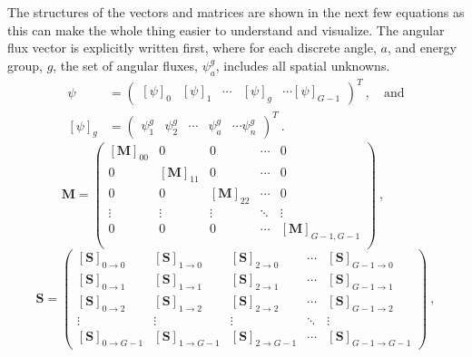 \documentclass[12pt]{article}
\newcommand{\ve}[1]{\ensuremath{\mathbf{#1}}}
\begin{document}
The structures of the vectors and matrices are shown in the next few equations as this can make the whole thing easier to understand and visualize. The angular flux vector is explicitly written first, where for each discrete angle, $a$, and energy group, $g$, the set of angular fluxes, $ \psi^g_a$, includes all spatial unknowns.
%
 \begin{align}
    \psi &=     \begin{pmatrix}
    [\psi]_{0} & [\psi]_1 & \cdots & [\psi]_g & \cdots [\psi]_{G-1} 
  \end{pmatrix}^T  \:, \quad \text{and}  \\
    [\psi]_g &= \begin{pmatrix}
    \psi^g_1 & \psi^g_2& \cdots & \psi^g_a & \cdots \psi^g_n 
  \end{pmatrix}^T \:.  
\end{align}
%
\begin{equation}
  \mathbf{M} =    \begin{pmatrix}
      [\ve{M}]_{00} & 0 & 0 & \cdots & 0 \\
      0 & [\ve{M}]_{11} & 0 & \cdots & 0 \\
      0 & 0 & [\ve{M}]_{22} & \cdots & 0 \\
      \vdots & \vdots & \vdots & \ddots   & \vdots \\
      0 & 0 & 0 & \cdots & [\ve{M}]_{G-1,G-1} \\
    \end{pmatrix} \nonumber  \:, \qquad  %
    \end{equation}
    \begin{equation}
  \mathbf{S}  =     \begin{pmatrix}
      [\ve{S}]_{0\rightarrow0} & [\ve{S}]_{1\rightarrow0} & [\ve{S}]_{2\rightarrow0} & \cdots &
      [\ve{S}]_{G-1\rightarrow0} \\
      [\ve{S}]_{0\rightarrow1} & [\ve{S}]_{1\rightarrow1} & [\ve{S}]_{2\rightarrow1} & \cdots &
      [\ve{S}]_{G-1\rightarrow1} \\
      [\ve{S}]_{0\rightarrow2} & [\ve{S}]_{1\rightarrow2} & [\ve{S}]_{2\rightarrow2} & \cdots &
      [\ve{S}]_{G-1\rightarrow2} \\
      \vdots & \vdots & \vdots & \ddots & \vdots \\
      [\ve{S}]_{0\rightarrow G-1} & [\ve{S}]_{1\rightarrow G-1} & [\ve{S}]_{2\rightarrow G-1} & \cdots &
      [\ve{S}]_{G-1\rightarrow G-1}
    \end{pmatrix} \nonumber  \:,
 \end{equation}
\end{document}
